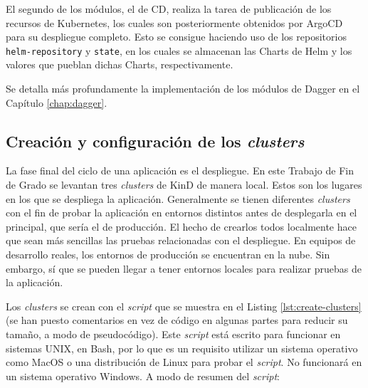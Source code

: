 El segundo de los módulos, el de CD, realiza la tarea de publicación de los recursos de Kubernetes, los cuales son posteriormente obtenidos por ArgoCD para su despliegue completo. Esto se consigue haciendo uso de los repositorios \texttt{helm-repository} y \texttt{state}, en los cuales se almacenan las Charts de Helm y los valores que pueblan dichas Charts, respectivamente.

Se detalla más profundamente la implementación de los módulos de Dagger en el Capítulo \ref{chap:dagger}.

\subsection*{Creación y configuración de los \textit{clusters}}
\label{subsec:clusters}

La fase final del ciclo de una aplicación es el despliegue. En este Trabajo de Fin de Grado se levantan tres \textit{clusters} de KinD de manera local. Estos son los lugares en los que se despliega la aplicación. Generalmente se tienen diferentes \textit{clusters} con el fin de probar la aplicación en entornos distintos antes de desplegarla en el principal, que sería el de producción. El hecho de crearlos todos localmente hace que sean más sencillas las pruebas relacionadas con el despliegue. En equipos de desarrollo reales, los entornos de producción se encuentran en la nube. Sin embargo, sí que se pueden llegar a tener entornos locales para realizar pruebas de la aplicación.

Los \textit{clusters} se crean con el \textit{script} que se muestra en el Listing \ref{lst:create-clusters} (se han puesto comentarios en vez de código en algunas partes para reducir su tamaño, a modo de pseudocódigo). Este \textit{script} está escrito para funcionar en sistemas UNIX, en Bash, por lo que es un requisito utilizar un sistema operativo como MacOS o una distribución de Linux para probar el \textit{script}. No funcionará en un sistema operativo Windows. A modo de resumen del \textit{script}:

